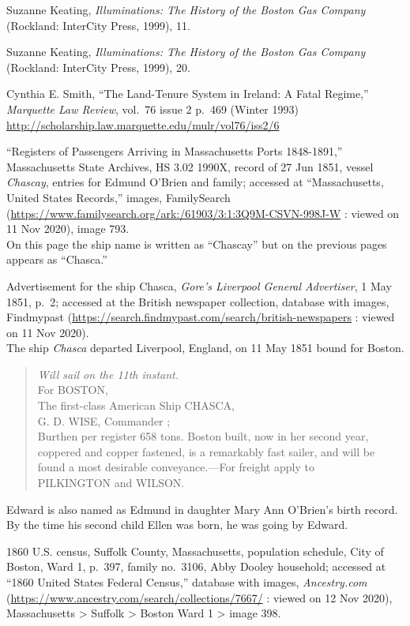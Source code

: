\begin{thebibliography}{999}
	Suzanne Keating, \textit{Illuminations: The History of the Boston Gas Company} (Rockland: InterCity Press, 1999), 11.
	
	Suzanne Keating, \textit{Illuminations: The History of the Boston Gas Company} (Rockland: InterCity Press, 1999), 20.
	
	Cynthia E. Smith, ``The Land-Tenure System in Ireland: A Fatal Regime,'' \textit{Marquette Law Review}, vol.\ 76 issue 2 p.\ 469 (Winter 1993) \url{http://scholarship.law.marquette.edu/mulr/vol76/iss2/6}
	
	``Registers of Passengers Arriving in Massachusetts Ports 1848-1891,'' Massachusetts State Archives, HS 3.02 1990X, record of 27 Jun 1851, vessel \textit{Chascay}, entries for Edmund O'Brien and family; accessed at ``Massachusetts, United States Records,'' images, FamilySearch (\url{https://www.familysearch.org/ark:/61903/3:1:3Q9M-CSVN-998J-W} : viewed on 11 Nov 2020), image 793.\\
	On this page the ship name is written as ``Chascay'' but on the previous pages appears as ``Chasca.''
	
	Advertisement for the ship Chasca, \textit{Gore's Liverpool General Advertiser}, 1 May 1851, p.\ 2; accessed at the British newspaper collection, database with images, Findmypast (\url{https://search.findmypast.com/search/british-newspapers} : viewed on 11 Nov 2020).\\
	The ship \textit{Chasca} departed Liverpool, England, on 11 May 1851 bound for Boston. 
	\begin{quote}
		\textit{Will sail on the 11th instant.}\\
		For BOSTON,\\
		The first-class American Ship CHASCA,\\
		G. D. WISE, Commander ;\\
		Burthen per register 658 tons. Boston built, now in her second year, coppered and copper fastened, is a remarkably fast sailer, and will be found a most desirable conveyance.---For freight apply to\\
		PILKINGTON and WILSON.
	\end{quote}
	
	Edward is also named as Edmund in daughter Mary Ann O'Brien's birth record. By the time his second child Ellen was born, he was going by Edward.
	
	1860 U.S. census, Suffolk County, Massachusetts, population schedule, City of Boston, Ward 1, p.\ 397, family no.\ 3106, Abby Dooley household; accessed at ``1860 United States Federal Census,'' database with images, \textit{Ancestry.com} (\url{https://www.ancestry.com/search/collections/7667/} : viewed on 12 Nov 2020), Massachusetts > Suffolk > Boston Ward 1 > image 398.
	

\end{thebibliography}
